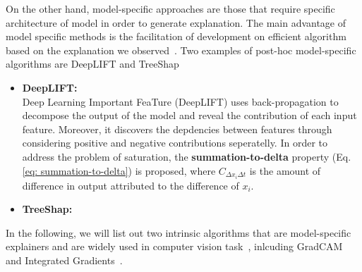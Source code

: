 \begin{itemize}
\end{itemize}

On the other hand, model-specific approaches are those that require specific architecture of model in order to generate explanation. The main advantage of model specific methods is the facilitation of development on efficient algorithm based on the explanation we observed~\citep{Belle2020XAIPriciples}. Two examples of post-hoc model-specific algorithms are DeepLIFT \citep{Shrikumar2017DeepLIFT} and TreeShap \citep{}

\begin{itemize}
    \item \textbf{DeepLIFT:} \\ Deep Learning Important FeaTure (DeepLIFT) \citep{Shrikumar2017DeepLIFT} uses back-propagation to decompose the output of the model and reveal the contribution of each input feature. Moreover, it discovers the depdencies between features through considering positive and negative contributions seperatelly. In order to address the problem of saturation, the \textbf{summation-to-delta} property (Eq. \ref{eq: summation-to-delta}) is proposed, where $C_{\Delta x_{i} \Delta t}$ is the amount of difference in output attributed to the difference of $x_{i}$.
    \item \textbf{TreeShap:} \\ 
\end{itemize}

In the following, we will list out two intrinsic algorithms that are model-specific explainers and are widely used in computer vision task~\citep{Spinner2020explAIner}, inlcuding GradCAM~\citep{Selvaraju2017GradCAM} and Integrated Gradients~\citep{Sundararajan2017IntegratedGradient}.


